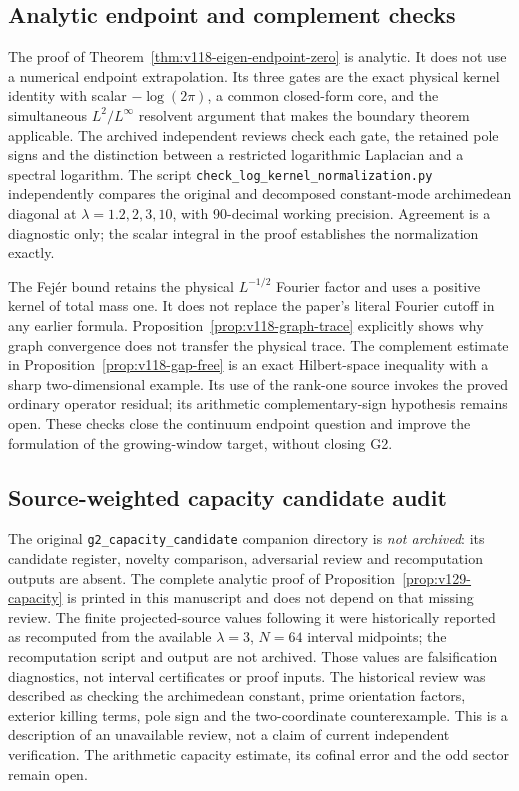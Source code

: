 \documentclass[11pt]{article}
\theoremstyle{remark}
\begin{document}
\subsection*{Analytic endpoint and complement checks}
The proof of Theorem~\ref{thm:v118-eigen-endpoint-zero} is analytic.
It does not use a numerical endpoint extrapolation. Its three gates are
the exact physical kernel identity with scalar $-\log(2\pi)$, a common
closed-form core, and the simultaneous $L^2/L^\infty$ resolvent argument
that makes the boundary theorem applicable. The archived independent
reviews check each gate, the retained pole signs and the distinction
between a restricted logarithmic Laplacian and a spectral logarithm.
The script \texttt{check\_log\_kernel\_normalization.py} independently
compares the original and decomposed constant-mode archimedean diagonal
at $\lambda=1.2,2,3,10$, with 90-decimal working precision. Agreement is
a diagnostic only; the scalar integral in the proof establishes the
normalization exactly.

The Fej\'er bound retains the physical $L^{-1/2}$ Fourier factor and
uses a positive kernel of total mass one. It does not replace the
paper's literal Fourier cutoff in any earlier formula.
Proposition~\ref{prop:v118-graph-trace} explicitly shows why graph
convergence does not transfer the physical trace.
The complement estimate in Proposition~\ref{prop:v118-gap-free}
is an exact Hilbert-space inequality with a sharp two-dimensional
example. Its use of the rank-one source invokes the proved ordinary
operator residual; its arithmetic complementary-sign hypothesis remains
open. These checks close the continuum endpoint question and improve
the formulation of the growing-window target, without closing G2.

\subsection*{Source-weighted capacity candidate audit}
The original \texttt{g2\_capacity\_candidate} companion directory is
\emph{not archived}: its candidate register, novelty comparison,
adversarial review and recomputation outputs are absent. The complete
analytic proof of Proposition~\ref{prop:v129-capacity} is printed in this
manuscript and does not depend on that missing review. The finite
projected-source values following it were historically reported as
recomputed from the available $\lambda=3$, $N=64$ interval midpoints;
the recomputation script and output are not archived. Those values are
falsification diagnostics, not interval certificates or proof inputs.
The historical review was described as checking the archimedean constant,
prime orientation factors, exterior killing terms, pole sign and the
two-coordinate counterexample. This is a description of an unavailable
review, not a claim of current independent verification. The arithmetic
capacity estimate, its cofinal error and the odd sector remain open.
\end{document}
